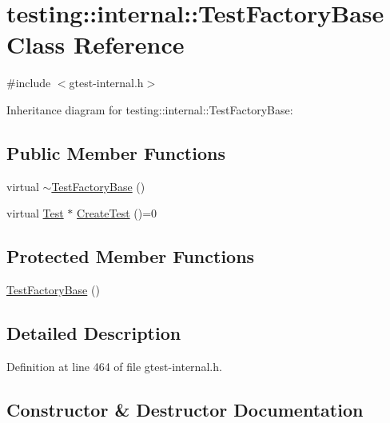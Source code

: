\hypertarget{classtesting_1_1internal_1_1_test_factory_base}{}\section{testing\+:\+:internal\+:\+:Test\+Factory\+Base Class Reference}
\label{classtesting_1_1internal_1_1_test_factory_base}


{\ttfamily \#include $<$gtest-\/internal.\+h$>$}



Inheritance diagram for testing\+:\+:internal\+:\+:Test\+Factory\+Base\+:
\subsection*{Public Member Functions}
\begin{DoxyCompactItemize}
\item 
virtual \hyperlink{classtesting_1_1internal_1_1_test_factory_base_a18f22a7594336a36642289c1decddc9e}{$\sim$\+Test\+Factory\+Base} ()
\item 
virtual \hyperlink{classtesting_1_1_test}{Test} $\ast$ \hyperlink{classtesting_1_1internal_1_1_test_factory_base_a07ac3ca0b196cdb092da0bb186b7c030}{Create\+Test} ()=0
\end{DoxyCompactItemize}
\subsection*{Protected Member Functions}
\begin{DoxyCompactItemize}
\item 
\hyperlink{classtesting_1_1internal_1_1_test_factory_base_afedbf147b2a213517b315880d8c81427}{Test\+Factory\+Base} ()
\end{DoxyCompactItemize}


\subsection{Detailed Description}


Definition at line 464 of file gtest-\/internal.\+h.



\subsection{Constructor \& Destructor Documentation}
